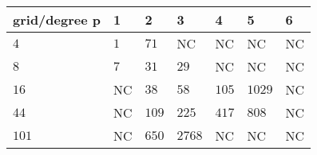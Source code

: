 \begin{tabular}{lllllll}
\hline
 grid/degree p   & 1   & 2     & 3      & 4     & 5      & 6   \\
\hline
 $4$             & $1$ & $71$  & NC     & NC    & NC     & NC  \\
 $8$             & $7$ & $31$  & $29$   & NC    & NC     & NC  \\
 $16$            & NC  & $38$  & $58$   & $105$ & $1029$ & NC  \\
 $44$            & NC  & $109$ & $225$  & $417$ & $808$  & NC  \\
 $101$           & NC  & $650$ & $2768$ & NC    & NC     & NC  \\
\hline
\end{tabular}